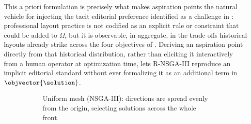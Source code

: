 This a priori formulation is precisely what makes aspiration points the natural vehicle for injecting the tacit editorial preference identified as a challenge in : professional layout practice is not codified as an explicit rule or constraint that could be added to $\Omega$, but it is observable, in aggregate, in the trade-offs historical layouts already strike across the four objectives of . Deriving an aspiration point directly from that historical distribution, rather than eliciting it interactively from a human operator at optimization time, lets R-NSGA-III reproduce an implicit editorial standard without ever formalizing it as an additional term in $\objvector{\solution}$.

\begin{figure}[htbp]
    \centering
    \begin{subfigure}{0.48\textwidth}
        \centering
        \caption{Uniform mesh (NSGA-III): directions are spread evenly from the origin, selecting solutions across the whole front.}
        \label{fig:sota-aspiration-points-a}
    \end{subfigure}
    \hfill
    \begin{subfigure}{0.48\textwidth}
        \centering
\end{subfigure}
\end{figure}
